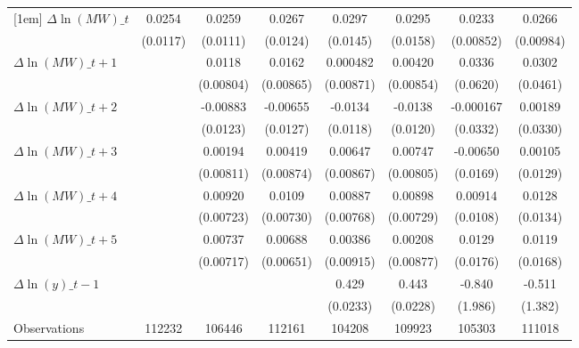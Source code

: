 {\begin{tabular}{l*{7}{c}}
[1em]
$\Delta \ln(MW)\_{t}$&   0.0254\sym{**} &   0.0259\sym{**} &   0.0267\sym{**} &   0.0297\sym{**} &   0.0295\sym{*}  &   0.0233\sym{***}&   0.0266\sym{**} \\
          & (0.0117)         & (0.0111)         & (0.0124)         & (0.0145)         & (0.0158)         &(0.00852)         &(0.00984)         \\
[1em]
$\Delta \ln(MW)\_{t+1}$&                  &   0.0118         &   0.0162\sym{*}  & 0.000482         &  0.00420         &   0.0336         &   0.0302         \\
          &                  &(0.00804)         &(0.00865)         &(0.00871)         &(0.00854)         & (0.0620)         & (0.0461)         \\
[1em]
$\Delta \ln(MW)\_{t+2}$&                  & -0.00883         & -0.00655         &  -0.0134         &  -0.0138         &-0.000167         &  0.00189         \\
          &                  & (0.0123)         & (0.0127)         & (0.0118)         & (0.0120)         & (0.0332)         & (0.0330)         \\
[1em]
$\Delta \ln(MW)\_{t+3}$&                  &  0.00194         &  0.00419         &  0.00647         &  0.00747         & -0.00650         &  0.00105         \\
          &                  &(0.00811)         &(0.00874)         &(0.00867)         &(0.00805)         & (0.0169)         & (0.0129)         \\
[1em]
$\Delta \ln(MW)\_{t+4}$&                  &  0.00920         &   0.0109         &  0.00887         &  0.00898         &  0.00914         &   0.0128         \\
          &                  &(0.00723)         &(0.00730)         &(0.00768)         &(0.00729)         & (0.0108)         & (0.0134)         \\
[1em]
$\Delta \ln(MW)\_{t+5}$&                  &  0.00737         &  0.00688         &  0.00386         &  0.00208         &   0.0129         &   0.0119         \\
          &                  &(0.00717)         &(0.00651)         &(0.00915)         &(0.00877)         & (0.0176)         & (0.0168)         \\
[1em]
$\Delta \ln(y)\_{t-1}$&                  &                  &                  &    0.429\sym{***}&    0.443\sym{***}&   -0.840         &   -0.511         \\
          &                  &                  &                  & (0.0233)         & (0.0228)         &  (1.986)         &  (1.382)         \\
\hline
Observations&   112232         &   106446         &   112161         &   104208         &   109923         &   105303         &   111018         \\
\hline\hline
\end{tabular}
}
